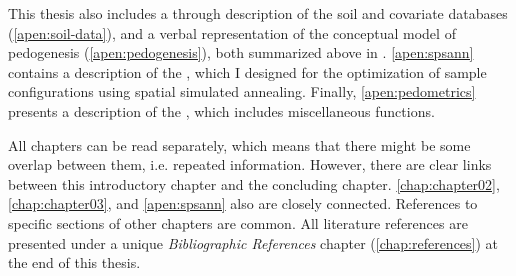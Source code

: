 This thesis also includes a through description of the soil and covariate databases
(\autoref{apen:soil-data}), and a verbal representation of the conceptual model of pedogenesis
(\autoref{apen:pedogenesis}), both summarized above in . \autoref{apen:spsann} contains
a description of the , which I designed for the optimization of sample configurations
using spatial simulated annealing. Finally, \autoref{apen:pedometrics} presents a description of the
, which includes miscellaneous functions.

All chapters can be read separately, which means that there might be some overlap between them,
i.e. repeated information. However, there are clear links between this introductory chapter
and the concluding chapter. \autoref{chap:chapter02}, \autoref{chap:chapter03}, and \autoref{apen:spsann}
also are closely connected. References to specific sections of other chapters are common. All literature
references are presented under a unique \emph{Bibliographic References} chapter (\autoref{chap:references})
at the end of this thesis.
